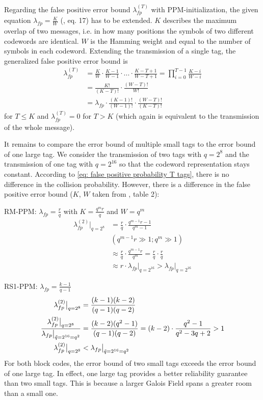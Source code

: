 \documentclass[english,BCOR=4mm,cdfont=false]{tudscrreprt} %
\begin{document}
Regarding the false positive error bound $\lambda_{fp}^{(T)}$ with PPM-initialization, the given equation $\lambda_{fp} = \frac{K}{W}$ (\cite{ID_Codes_Topical_Review}, eq. 17) has to be extended. $K$ describes the maximum overlap of two messages, i.e. in how many positions the symbols of two different codewords are identical. $W$ is the Hamming weight and equal to the number of symbols in each codeword. Extending the transmission of a single tag, the generalized false positive error bound is
\begin{align}
    \lambda_{fp}^{(T)} &=\frac{K}{W} \cdot \frac{K-1}{W-1}\cdot ... \cdot\frac{K-T+1}{W-T+1} = \prod_{i=0}^{T-1} \frac{K-i}{W-i}\\
    &= \frac{K!}{(K-T)!} \cdot \frac{(W-T)!}{W!}\\
    &= \lambda_{fp} \cdot \frac{(K-1)!}{(W-1)!} \cdot \frac{(W-T)!}{(K-T)!}
\end{align}
for $T\leq K$ and $\lambda_{fp}^{(T)} = 0$ for $T>K$ (which again is equivalent to the transmission of the whole message).

It remains to compare the error bound of multiple small tags to the error bound of one large tag. We consider the transmission of two tags with $q = 2^8$ and the transmission of one tag with $q = 2^{16}$ so that the codeword representation stays constant. According to \eqref{eq: false positive probability T tags}, there is no difference in the collision probability. However, there is a difference in the false positive error bound ($K$, $W$ taken from \cite{ID_Codes_Topical_Review}, table 2): 

RM-PPM: $\lambda_{fp} = \frac{r}{q}$ with $K = \frac{q^m r}{q}$ and $W = q^m$ 
\begin{align}
    \lambda_{fp}^{(2)}\big|_{q=2^8} &= \frac{r}{q} \cdot \frac{q^{m-1} r -1}{q^m - 1}\\
    &(q^{m-1}r \gg 1; q^m \gg 1) \nonumber\\
    &\approx \frac{r}{q} \cdot \frac{q^{m-1} r}{q^m} = \frac{r}{q} \cdot \frac{r}{q}\\
    &\approx r\cdot \lambda_{fp}\big|_{q = 2^{16}} > \lambda_{fp}\big|_{q = 2^{16}}
\end{align}

RS1-PPM: $\lambda_{fp} = \frac{k-1}{q-1}$
\begin{align}
    \lambda_{fp}^{(2)}\big|_{q=2^8} &= \frac{(k-1)(k-2)}{(q-1)(q-2)}\\
    \frac{\lambda_{fp}^{(2)}\big|_{q=2^8}}{\lambda_{fp}\big|_{\Tilde{q} = 2^{16} = q^2}} &= \frac{(k-2)(q^2-1)}{(q-1)(q-2)} = (k-2) \cdot \frac{q^2 - 1}{q^2 -3q + 2} > 1\\
    \lambda_{fp}^{(2)}\big|_{q=2^8} & < \lambda_{fp}\big|_{\Tilde{q} = 2^{16} = q^2}
\end{align}
For both block codes, the error bound of two small tags exceeds the error bound of one large tag. In effect, one large tag provides a better reliability guarantee than two small tags. This is because a larger Galois Field spans a greater room than a small one.
\end{document}
